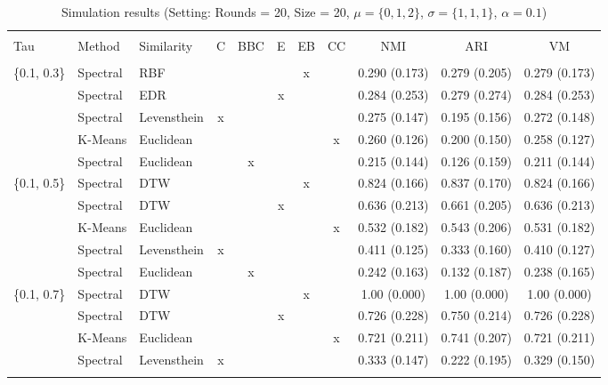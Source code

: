 \documentclass[12pt,a4paper,bibliography=totocnumbered,listof=totocnumbered]{scrartcl}
\begin{document}
{\begin{appendix}
\begin{table}[H] \centering 
	\label{} 
	\scriptsize
	\begin{tabularx}{\textwidth}{ lllcccccccc} \\
		\\[-1.8ex]	\toprule
		\\[-1.8ex] 
		Tau & Method & Similarity & C & BBC & E & EB & CC & NMI & ARI & VM \\ 
		\hline \\[-1.8ex] 
		\{0.1, 0.3\} & Spectral & RBF &  &  &  & x &  & 0.290 (0.173) & 0.279 (0.205) & 0.279 (0.173) \\ 
		& Spectral & EDR &  &  & x &  &  & 0.284 (0.253) & 0.279 (0.274) & 0.284 (0.253) \\ 
		& Spectral & Levensthein & x &  &  &  &  & 0.275 (0.147) & 0.195 (0.156) & 0.272 (0.148) \\ 
		& K-Means & Euclidean &  &  &  &  & x & 0.260 (0.126) & 0.200 (0.150) & 0.258 (0.127) \\ 
		& Spectral & Euclidean &  & x &  &  &  & 0.215 (0.144) & 0.126 (0.159) & 0.211 (0.144) \\ 
		\{0.1, 0.5\} & Spectral & DTW &  &  &  & x &  & 0.824 (0.166) & 0.837 (0.170) & 0.824 (0.166) \\ 
		& Spectral & DTW &  &  & x &  &  & 0.636 (0.213) & 0.661 (0.205) & 0.636 (0.213) \\ 
		& K-Means & Euclidean &  &  &  &  & x & 0.532 (0.182) & 0.543 (0.206) & 0.531 (0.182) \\ 
		& Spectral & Levensthein & x &  &  &  &  & 0.411 (0.125) & 0.333 (0.160) & 0.410 (0.127) \\ 
		& Spectral & Euclidean &  & x &  &  &  & 0.242 (0.163) & 0.132 (0.187) & 0.238 (0.165) \\ 
		\{0.1, 0.7\} & Spectral & DTW &  &  &  & x &  & 1.00 (0.000) & 1.00 (0.000) & 1.00 (0.000) \\ 
		& Spectral & DTW &  &  & x &  &  & 0.726 (0.228) & 0.750 (0.214) & 0.726 (0.228) \\ 
		& K-Means & Euclidean &  &  &  &  & x & 0.721 (0.211) & 0.741 (0.207) & 0.721 (0.211) \\ 
		& Spectral & Levensthein & x &  &  &  &  & 0.333 (0.147) & 0.222 (0.195) & 0.329 (0.150) \\ 
		\hline \\[-1.8ex] 
	\end{tabularx} 
	\caption{Simulation results (Setting: Rounds = 20, Size = 20, $\mu = \{0,1,2\}$, $\sigma =  \{1,1,1\}$, $\alpha = 0.1$)} 
		\label{tab:apstab4}
\end{table} 



\end{appendix}}
\end{document}
